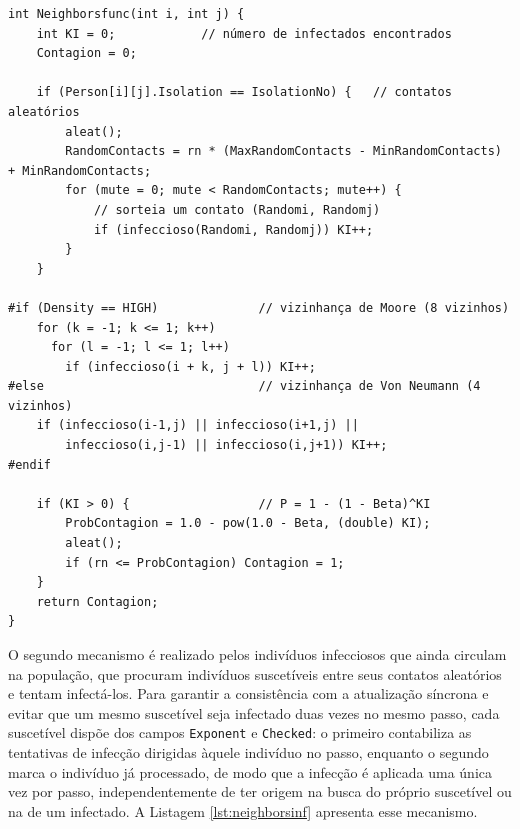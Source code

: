 \documentclass[
	12pt,				%
	openright,			%
	oneside,			%
	a4paper,			%
	english,			%
	french,				%
	spanish,			%
	brazil				%
	]{abntex2}
\begin{document}
\begin{lstlisting}[caption={Primeiro mecanismo: o suscetível busca infectados (\texttt{Neighborsfunc}).}, label={lst:neighbors}]
int Neighborsfunc(int i, int j) {
    int KI = 0;            // número de infectados encontrados
    Contagion = 0;

    if (Person[i][j].Isolation == IsolationNo) {   // contatos aleatórios
        aleat();
        RandomContacts = rn * (MaxRandomContacts - MinRandomContacts) + MinRandomContacts;
        for (mute = 0; mute < RandomContacts; mute++) {
            // sorteia um contato (Randomi, Randomj)
            if (infeccioso(Randomi, Randomj)) KI++;
        }
    }

#if (Density == HIGH)              // vizinhança de Moore (8 vizinhos)
    for (k = -1; k <= 1; k++)
      for (l = -1; l <= 1; l++)
        if (infeccioso(i + k, j + l)) KI++;
#else                              // vizinhança de Von Neumann (4 vizinhos)
    if (infeccioso(i-1,j) || infeccioso(i+1,j) ||
        infeccioso(i,j-1) || infeccioso(i,j+1)) KI++;
#endif

    if (KI > 0) {                  // P = 1 - (1 - Beta)^KI
        ProbContagion = 1.0 - pow(1.0 - Beta, (double) KI);
        aleat();
        if (rn <= ProbContagion) Contagion = 1;
    }
    return Contagion;
}
\end{lstlisting}

O segundo mecanismo é realizado pelos indivíduos infecciosos que ainda circulam na população, que procuram indivíduos suscetíveis entre seus contatos aleatórios e tentam infectá-los. Para garantir a consistência com a atualização síncrona e evitar que um mesmo suscetível seja infectado duas vezes no mesmo passo, cada suscetível dispõe dos campos \texttt{Exponent} e \texttt{Checked}: o primeiro contabiliza as tentativas de infecção dirigidas àquele indivíduo no passo, enquanto o segundo marca o indivíduo já processado, de modo que a infecção é aplicada uma única vez por passo, independentemente de ter origem na busca do próprio suscetível ou na de um infectado. A Listagem \ref{lst:neighborsinf} apresenta esse mecanismo.
\end{document}
